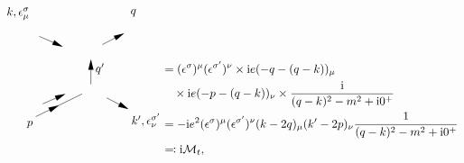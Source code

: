 \begin{equation}
\begin{gathered}
\begin{tikzpicture}[x=0.75pt,y=0.75pt,yscale=-1,xscale=1]
            \draw    (190,226.67) -- (243,200.67) ;
            \draw [shift={(216.5,213.67)}, rotate = 153.87] [fill={rgb, 255:red, 0; green, 0; blue, 0 }  ][line width=0.08]  [draw opacity=0] (12,-3) -- (0,0) -- (12,3) -- cycle    ;
            \draw    (194,134.67) -- (219.17,145.85) ;
            \draw [shift={(221,146.67)}, rotate = 203.96] [fill={rgb, 255:red, 0; green, 0; blue, 0 }  ][line width=0.08]  [draw opacity=0] (12,-3) -- (0,0) -- (12,3) -- cycle    ;
            \draw    (198,212) -- (222.17,201.47) ;
            \draw [shift={(224,200.67)}, rotate = 156.45] [fill={rgb, 255:red, 0; green, 0; blue, 0 }  ][line width=0.08]  [draw opacity=0] (12,-3) -- (0,0) -- (12,3) -- cycle    ;
            \draw    (289.23,132.09) -- (266,144.17) ;
            \draw [shift={(291,131.17)}, rotate = 152.53] [fill={rgb, 255:red, 0; green, 0; blue, 0 }  ][line width=0.08]  [draw opacity=0] (12,-3) -- (0,0) -- (12,3) -- cycle    ;
            \draw    (294.23,217.24) -- (271,205.17) ;
            \draw [shift={(296,218.17)}, rotate = 207.47] [fill={rgb, 255:red, 0; green, 0; blue, 0 }  ][line width=0.08]  [draw opacity=0] (12,-3) -- (0,0) -- (12,3) -- cycle    ;
            \draw    (253,163) -- (253,189.67) ;
            \draw [shift={(253,161)}, rotate = 90] [fill={rgb, 255:red, 0; green, 0; blue, 0 }  ][line width=0.08]  [draw opacity=0] (12,-3) -- (0,0) -- (12,3) -- cycle    ;
            
            \draw (297,113.27) node [anchor=south west] [inner sep=0.75pt]    {$q$};
            \draw (188,230.07) node [anchor=north east] [inner sep=0.75pt]    {$p$};
            \draw (257,164.4) node [anchor=north west][inner sep=0.75pt]    {$q'$};
            \draw (184,117.27) node [anchor=south east] [inner sep=0.75pt]    {$k,\epsilon _{\mu }^{\sigma }$};
            \draw (298,221.57) node [anchor=north west][inner sep=0.75pt]    {$k',\epsilon _{\nu }^{\sigma '}$};
            \end{tikzpicture}                    
    \end{gathered} \begin{aligned}[t]
        &= (\epsilon^\sigma)^\mu (\epsilon^{\sigma'})^\nu \times \ii e (- q - (q-k))_\mu \\
        &\quad \times \ii e (- p - (q-k))_\nu \times \frac{\ii}{(q-k)^2 - m^2 + \ii 0^+} \\
        &= - \ii e^2 (\epsilon^\sigma)^\mu (\epsilon^{\sigma'})^\nu (k-2q)_\mu (k'-2p)_\nu \frac{1}{(q-k)^2 - m^2 + \ii 0^+} \\
        & \eqqcolon \ii \mathcal{M}_t ,
    \end{aligned}
\end{equation}